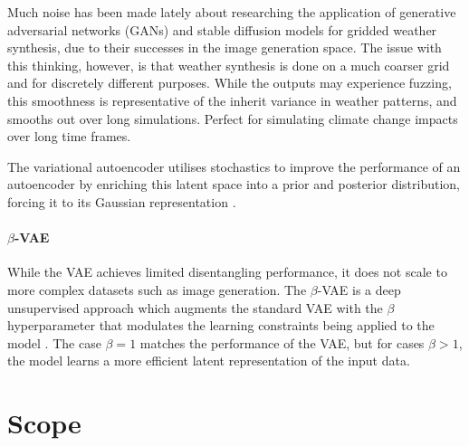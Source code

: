 Much noise has been made lately about researching the application of generative adversarial
networks (GANs) and stable diffusion models for gridded weather synthesis, due to their 
successes in the image generation space. The issue with this thinking, however, is that 
weather synthesis is done on a much coarser grid and for discretely different purposes.
While the outputs may experience fuzzing, this smoothness is representative of the inherit
variance in weather patterns, and smooths out over long simulations. Perfect for simulating
climate change impacts over long time frames.

The variational autoencoder utilises stochastics to improve the performance of an 
autoencoder by enriching this latent space into a prior and posterior distribution, forcing
it to its Gaussian representation \cite{vae}.

\subsubsection{$\beta$-VAE}

While the VAE achieves limited disentangling performance, it does not scale to more complex
datasets such as image generation. The $\beta$-VAE is a deep unsupervised approach which
augments the standard VAE with the $\beta$ hyperparameter that modulates the learning 
constraints being applied to the model \cite{beta-vae}. The case $\beta=1$ matches the 
performance of the VAE, but for cases $\beta>1$, the model learns a more efficient latent 
representation of the input data. 

\chapter{Scope} \label{Section:Scope}